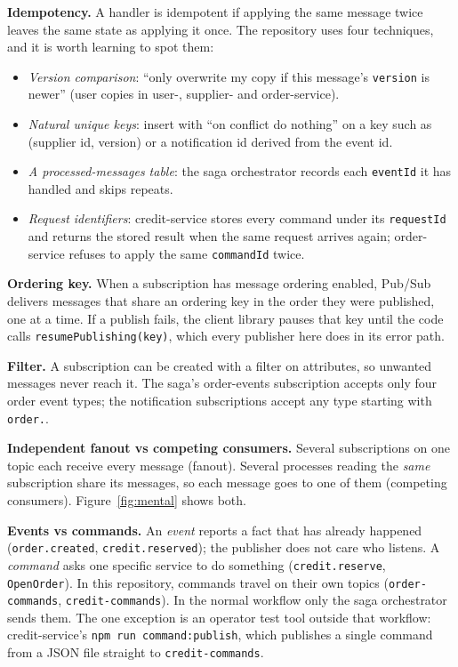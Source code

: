 \documentclass[11pt,a4paper]{article}
\newcommand{\code}[1]{\nolinkurl{#1}}
\begin{document}
\textbf{Idempotency.} A handler is idempotent if applying the same message twice leaves
the same state as applying it once. The repository uses four techniques, and it is worth
learning to spot them:
\begin{itemize}
  \item \emph{Version comparison}: ``only overwrite my copy if this message's
  \code{version} is newer'' (user copies in user-, supplier- and order-service).
  \item \emph{Natural unique keys}: insert with ``on conflict do nothing'' on a key such
  as (supplier id, version) or a notification id derived from the event id.
  \item \emph{A processed-messages table}: the saga orchestrator records each
  \code{eventId} it has handled and skips repeats.
  \item \emph{Request identifiers}: credit-service stores every command under its
  \code{requestId} and returns the stored result when the same request arrives again;
  order-service refuses to apply the same \code{commandId} twice.
\end{itemize}

\textbf{Ordering key.} When a subscription has message ordering enabled, Pub/Sub delivers
messages that share an ordering key in the order they were published, one at a time. If
a publish fails, the client library pauses that key until the code calls
\code{resumePublishing(key)}, which every publisher here does in its error path.

\textbf{Filter.} A subscription can be created with a filter on attributes, so unwanted
messages never reach it. The saga's order-events subscription accepts only four order
event types; the notification subscriptions accept any type starting with
\code{order.}.

\textbf{Independent fanout vs competing consumers.} Several subscriptions on one topic
each receive every message (fanout). Several processes reading the \emph{same}
subscription share its messages, so each message goes to one of them (competing
consumers). Figure~\ref{fig:mental} shows both.

\textbf{Events vs commands.} An \emph{event} reports a fact that has already happened
(\code{order.created}, \code{credit.reserved}); the publisher does not care who listens.
A \emph{command} asks one specific service to do something (\code{credit.reserve},
\code{OpenOrder}). In this repository, commands travel on their own topics
(\code{order-commands}, \code{credit-commands}). In the normal workflow only the saga
orchestrator sends them. The one exception is an operator test tool outside that
workflow: credit-service's \code{npm run command:publish}, which publishes a single
command from a JSON file straight to \code{credit-commands}.
\end{document}
